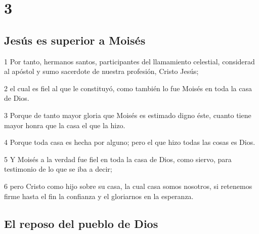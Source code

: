\chapter{3}

\section*{Jesús es superior a Moisés}

\par 1 Por tanto, hermanos santos, participantes del llamamiento celestial, considerad al apóstol y sumo sacerdote de nuestra profesión, Cristo Jesús;
\par 2 el cual es fiel al que le constituyó, como también lo fue Moisés en toda la casa de Dios.
\par 3 Porque de tanto mayor gloria que Moisés es estimado digno éste, cuanto tiene mayor honra que la casa el que la hizo.
\par 4 Porque toda casa es hecha por alguno; pero el que hizo todas las cosas es Dios.
\par 5 Y Moisés a la verdad fue fiel en toda la casa de Dios, como siervo, para testimonio de lo que se iba a decir;
\par 6 pero Cristo como hijo sobre su casa, la cual casa somos nosotros, si retenemos firme hasta el fin la confianza y el gloriarnos en la esperanza.

\section*{El reposo del pueblo de Dios}

